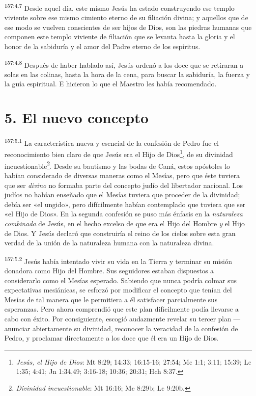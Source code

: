 \par 
\textsuperscript{157:4.7} Desde aquel día, este mismo Jesús ha estado construyendo ese templo viviente sobre ese mismo cimiento eterno de su filiación divina; y aquellos que de ese modo se vuelven conscientes de ser hijos de Dios, son las piedras humanas que componen este templo viviente de filiación que se levanta hasta la gloria y el honor de la sabiduría y el amor del Padre eterno de los espíritus.

\par 
\textsuperscript{157:4.8} Después de haber hablado así, Jesús ordenó a los doce que se retiraran a solas en las colinas, hasta la hora de la cena, para buscar la sabiduría, la fuerza y la guía espiritual. E hicieron lo que el Maestro les había recomendado.

\section*{5. El nuevo concepto}
\par 
\textsuperscript{157:5.1} La característica nueva y esencial de la confesión de Pedro fue el reconocimiento bien claro de que Jesús era el Hijo de Dios\footnote{\textit{Jesús, el Hijo de Dios}: Mt 8:29; 14:33; 16:15-16; 27:54; Mc 1:1; 3:11; 15:39; Lc 1:35; 4:41; Jn 1:34,49; 3:16-18; 10:36; 20:31; Hch 8:37.}, de su divinidad incuestionable\footnote{\textit{Divinidad incuestionable}: Mt 16:16; Mc 8:29b; Lc 9:20b.}. Desde su bautismo y las bodas de Caná, estos apóstoles lo habían considerado de diversas maneras como el Mesías, pero que éste tuviera que ser \textit{divino} no formaba parte del concepto judío del libertador nacional. Los judíos no habían enseñado que el Mesías tuviera que proceder de la divinidad; debía ser «el ungido», pero difícilmente habían contemplado que tuviera que ser «el Hijo de Dios». En la segunda confesión se puso más énfasis en la \textit{naturaleza} \textit{combinada} de Jesús, en el hecho excelso de que era el Hijo del Hombre \textit{y} el Hijo de Dios. Y Jesús declaró que construiría el reino de los cielos sobre esta gran verdad de la unión de la naturaleza humana con la naturaleza divina.

\par 
\textsuperscript{157:5.2} Jesús había intentado vivir su vida en la Tierra y terminar su misión donadora como Hijo del Hombre. Sus seguidores estaban dispuestos a considerarlo como el Mesías esperado. Sabiendo que nunca podría colmar sus expectativas mesiánicas, se esforzó por modificar el concepto que tenían del Mesías de tal manera que le permitiera a él satisfacer parcialmente sus esperanzas. Pero ahora comprendió que este plan difícilmente podía llevarse a cabo con éxito. Por consiguiente, escogió audazmente revelar su tercer plan ---anunciar abiertamente su divinidad, reconocer la veracidad de la confesión de Pedro, y proclamar directamente a los doce que él era un Hijo de Dios.

